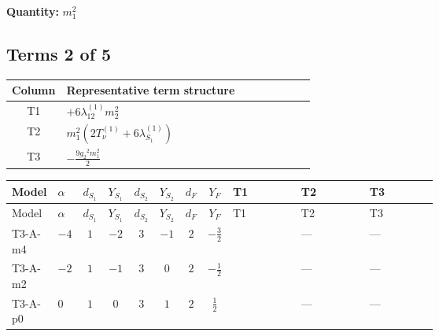 \documentclass[8pt]{article}
\begin{document}
\begin{landscape}
\begin{longtable}{@{}llcccccc >{\raggedright\arraybackslash}p{0.21\linewidth} >{\raggedright\arraybackslash}p{0.21\linewidth} >{\raggedright\arraybackslash}p{0.21\linewidth}@{}}
\midrule
\bottomrule
\end{longtable}
\clearpage
\noindent\textbf{Quantity: }$m_1^2$\par\smallskip
\subsection*{Terms 2 of 5}
\begin{center}
\begin{tabular}{@{}c >{\raggedright\arraybackslash}p{0.82\linewidth}@{}}
\toprule
Column & Representative term structure \\
\midrule
T1 & \(\displaystyle +6 {\lambda_{12}^{(1)}} {m_2^2}\) \\
\midrule
T2 & \(\displaystyle {m_1^2} (2 T_{\nu}^{(1)}+6 {\lambda_{S_1}^{(1)}})\) \\
\midrule
T3 & \(\displaystyle -\frac{9 {g_2}^2 {m_1^2}}{2}\) \\
\midrule
\bottomrule
\end{tabular}
\end{center}
\smallskip
\tiny
\begin{longtable}{@{}llcccccc >{\raggedright\arraybackslash}p{0.21\linewidth} >{\raggedright\arraybackslash}p{0.21\linewidth} >{\raggedright\arraybackslash}p{0.21\linewidth}@{}}
\toprule
Model & $\alpha$ & $d_{S_1}$ & $Y_{S_1}$ & $d_{S_2}$ & $Y_{S_2}$ & $d_F$ & $Y_F$ & T1 & T2 & T3 \\
\midrule
\endfirsthead
\toprule
Model & $\alpha$ & $d_{S_1}$ & $Y_{S_1}$ & $d_{S_2}$ & $Y_{S_2}$ & $d_F$ & $Y_F$ & T1 & T2 & T3 \\
\midrule
\endhead
T3-A-m4 & $-4$ & $1$ & $-2$ & $3$ & $-1$ & $2$ & $-\frac{3}{2}$ & \scriptsize\adjustbox{max width=\linewidth}{$\begin{gathered} +6 {\lambda_{12}^{(1)}} {m_2^2}\end{gathered}$} & --- & --- \\
\midrule
T3-A-m2 & $-2$ & $1$ & $-1$ & $3$ & $0$ & $2$ & $-\frac{1}{2}$ & \scriptsize\adjustbox{max width=\linewidth}{$\begin{gathered} +6 {\lambda_{12}^{(1)}} {m_2^2}\end{gathered}$} & --- & --- \\
\midrule
T3-A-p0 & $0$ & $1$ & $0$ & $3$ & $1$ & $2$ & $\frac{1}{2}$ & \scriptsize\adjustbox{max width=\linewidth}{$\begin{gathered} +6 {\lambda_{12}^{(1)}} {m_2^2}\end{gathered}$} & --- & --- \\

\end{longtable}
\end{landscape}
\end{document}
